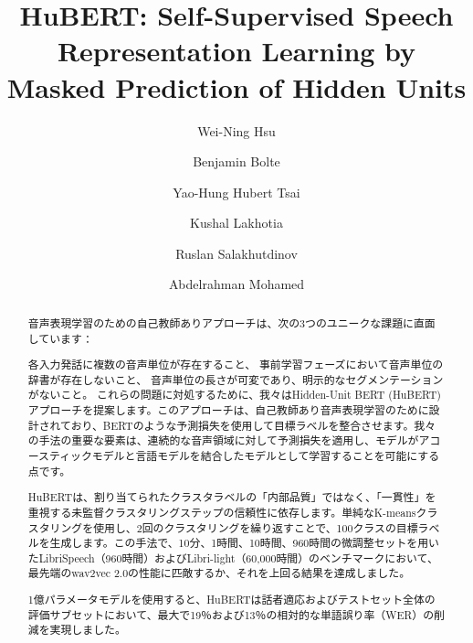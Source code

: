 \documentclass[]{ltjsarticle}
\begin{document}
\title{HuBERT: Self-Supervised Speech Representation Learning by Masked Prediction of Hidden Units}
\author{Wei-Ning Hsu \and Benjamin Bolte \and Yao-Hung Hubert Tsai \and Kushal Lakhotia \and
Ruslan Salakhutdinov \and Abdelrahman Mohamed}
\maketitle
\begin{abstract}
音声表現学習のための自己教師ありアプローチは、次の3つのユニークな課題に直面しています：

各入力発話に複数の音声単位が存在すること、
事前学習フェーズにおいて音声単位の辞書が存在しないこと、
音声単位の長さが可変であり、明示的なセグメンテーションがないこと。
これらの問題に対処するために、我々はHidden-Unit BERT (HuBERT) アプローチを提案します。このアプローチは、自己教師あり音声表現学習のために設計されており、BERTのような予測損失を使用して目標ラベルを整合させます。我々の手法の重要な要素は、連続的な音声領域に対して予測損失を適用し、モデルがアコースティックモデルと言語モデルを結合したモデルとして学習することを可能にする点です。

HuBERTは、割り当てられたクラスタラベルの「内部品質」ではなく、「一貫性」を重視する未監督クラスタリングステップの信頼性に依存します。単純なK-meansクラスタリングを使用し、2回のクラスタリングを繰り返すことで、100クラスの目標ラベルを生成します。この手法で、10分、1時間、10時間、960時間の微調整セットを用いたLibriSpeech（960時間）およびLibri-light（60,000時間）のベンチマークにおいて、最先端のwav2vec 2.0の性能に匹敵するか、それを上回る結果を達成しました。

1億パラメータモデルを使用すると、HuBERTは話者適応およびテストセット全体の評価サブセットにおいて、最大で19％および13％の相対的な単語誤り率（WER）の削減を実現しました。
\newline
 
 \end{abstract}
\end{document}
